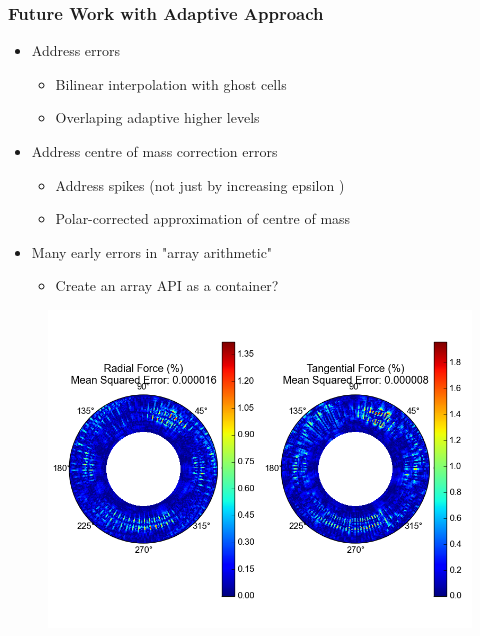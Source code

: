 \documentclass{beamer}
\begin{document}
\begin{frame}
 \frametitle{Future Work with Adaptive Approach}


	\begin{itemize}
  		\item Address errors
  		\begin{itemize}
    			\item Bilinear interpolation with ghost cells
    			\item Overlaping adaptive higher levels
  		\end{itemize}
  		\item Address centre of mass correction errors
  		\begin{itemize}
    			\item Address spikes (not just by increasing epsilon )
    			\item Polar-corrected approximation of centre of mass
  		\end{itemize}
  		\item Many early errors in "array arithmetic"
\begin{itemize}  		
  		\item Create an array API as a container?
	\end{itemize}
\end{itemize}





 \begin{figure}[H]
  \centering
  \includegraphics[width=.5\textwidth]{../../../Sara/run/default/diff_2D-polar.png} 

 \end{figure}
  
\end{frame}
\end{document}
